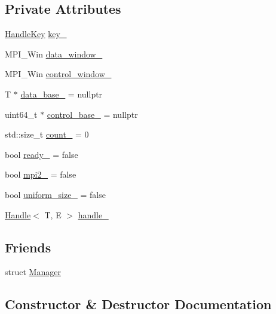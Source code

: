 \subsection*{Private Attributes}
\begin{DoxyCompactItemize}
\item 
\hyperlink{structvt_1_1rdma_1_1_handle_key}{Handle\+Key} \hyperlink{structvt_1_1rdma_1_1_holder_a32fc545bf53fbbd4002369112e5f02e0}{key\+\_\+}
\item 
M\+P\+I\+\_\+\+Win \hyperlink{structvt_1_1rdma_1_1_holder_a05f6eae32db15a58ef6cced25fde7980}{data\+\_\+window\+\_\+}
\item 
M\+P\+I\+\_\+\+Win \hyperlink{structvt_1_1rdma_1_1_holder_adfcf34183c7325a69e1ac6f550c471f1}{control\+\_\+window\+\_\+}
\item 
T $\ast$ \hyperlink{structvt_1_1rdma_1_1_holder_a347938e7cc24c482672fc73ed7be9406}{data\+\_\+base\+\_\+} = nullptr
\item 
uint64\+\_\+t $\ast$ \hyperlink{structvt_1_1rdma_1_1_holder_a4f9ee10b09fb58524ac3659f180a4a96}{control\+\_\+base\+\_\+} = nullptr
\item 
std\+::size\+\_\+t \hyperlink{structvt_1_1rdma_1_1_holder_adba61a40f9dd80d86ac7d0d82d415923}{count\+\_\+} = 0
\item 
bool \hyperlink{structvt_1_1rdma_1_1_holder_ad61ee11705da8cf0ba8664b3173e7370}{ready\+\_\+} = false
\item 
bool \hyperlink{structvt_1_1rdma_1_1_holder_aecfc6828df1f361fa24e2780b07b6d56}{mpi2\+\_\+} = false
\item 
bool \hyperlink{structvt_1_1rdma_1_1_holder_a6c137c841a55e053778597860c6761e8}{uniform\+\_\+size\+\_\+} = false
\item 
\hyperlink{structvt_1_1rdma_1_1_handle}{Handle}$<$ T, E $>$ \hyperlink{structvt_1_1rdma_1_1_holder_a0995b9b9adfce492d7d3dead1ed8ac7a}{handle\+\_\+}
\end{DoxyCompactItemize}
\subsection*{Friends}
\begin{DoxyCompactItemize}
\item 
struct \hyperlink{structvt_1_1rdma_1_1_holder_a1fd6b9bc3f72bb2b64e602de3982929d}{Manager}
\end{DoxyCompactItemize}


\subsection{Constructor \& Destructor Documentation}
\mbox{\label{structvt_1_1rdma_1_1_holder_aa0d947b72bd66a1a0507062f3dffd590}} 
